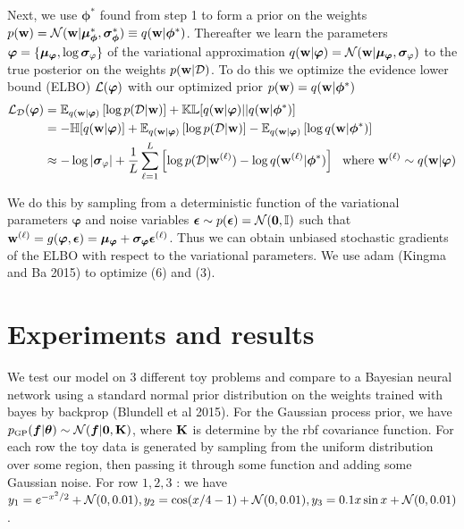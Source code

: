 \documentclass{article}
\begin{document}
Next, we use $\bm \phi^*$ found from step 1 to form a prior on the weights  
$p( \mathbf{w} ) =\mathcal{N} (  \mathbf{w}  |  \bm \mu _{\bm \phi} ^*,  \bm \sigma _{\bm \phi}^*)\equiv q( \mathbf{w}  | \bm \phi^*)$. 
Thereafter we learn the parameters 
$\bm \varphi =\{ \bm \mu_{\tiny\bm \varphi} , \log \bm \sigma _{\tiny \varphi} \} $
of the variational approximation 
$q(\B w | \bm \varphi) = \N (\B w |\bm \mu_{\tiny\bm \varphi} , \bm \sigma _{\tiny \varphi} )$ 
to the true posterior on the weights $p( \mathbf{w}  |\mathcal{D} )$. To do this we optimize the evidence lower bound (ELBO) $\mathcal{L} (\bm \varphi )$ with our optimized prior $p( \mathbf{w}  ) = q ( \mathbf{w}  | \bm {\bm \phi}^*   ) $ 
\begin{align}
    \elbo _\D (\bm \varphi ) 
    &=  \E _{q (\B w | \bm \varphi)} \BB{ \log p (\D | \B w ) }  + 
        \kl [q (\B w | \bm \varphi) || q (\B w | \bm \bphi^*  ) ] \\ 
    &=  -\entropy [ q (\B w | \bm \varphi)] + 
        \E _{q (\B w | \bm \varphi)} \BB{ \log p (\D | \B w )  } - 
        \E _{q (\B w | \bm \varphi)} \BB{ \log q (\B w | \bm \bphi^* ) } \\
    &\approx -\log |\bm \sigma _{\tiny \varphi} | + 
         \frac{1}{L}\sum _{\ell=1} ^L \BB{ \log p (\D | \B w ^{(\ell)} )  - \log q (\B w^{(\ell)}  | \bm \bphi^*  ) } \ \text{ where } \B w ^{(\ell)} \sim  q (\B w | \bm \varphi) 
\end{align}

We do this by sampling from a deterministic function of the variational parameters $\bm \varphi$ and noise variables 
$\bm \epsilon \sim p(\bm \epsilon) = \mathcal{N} ( \mathbf{0}  , \mathbb{I})$ such that 
$ \mathbf{w}  ^{(\ell)} = g(\bm \varphi, \bm \epsilon)= \bm \mu _{\bm \varphi} + \bm \sigma _{\bm \varphi}\bm \epsilon ^{(\ell)} $.
Thus we can obtain unbiased stochastic gradients of the ELBO
with respect to the variational parameters. We use adam (Kingma and Ba 2015) to optimize (6) and (3).



\newpage 
\section{Experiments and results}
We test our model on 3 different toy problems and compare to a Bayesian neural network using a standard
normal prior distribution on the weights trained with bayes by backprop (Blundell et al 2015). 
For the Gaussian process prior, we have $ \pgp (\bm f | \bm \theta ) \sim \N (\bm f | \B 0 , \B K )$, where $ \mathbf{K} $ is determine by the rbf covariance function. For each row the toy data is generated by sampling from the uniform distribution over some region, then passing it through some function and adding some Gaussian noise. For row $1,2,3$ : we have 
$y_1 = e^{-x^2/2} +\mathcal{N} (0,0.01), y_2 = \cos(x/4-1) +\mathcal{N} (0,0.01), y_3 = 0.1x\sin x +\mathcal{N} (0,0.01)$.
\end{document}
